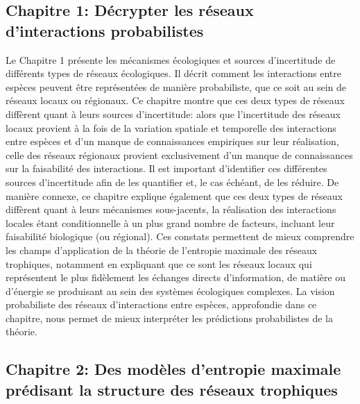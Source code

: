 \subsection{Chapitre 1: Décrypter les réseaux d'interactions probabilistes} 

Le Chapitre 1 présente les mécanismes écologiques et sources d'incertitude de
différents types de réseaux écologiques. Il décrit comment les interactions
entre espèces peuvent être représentées de manière probabiliste, que ce soit au
sein de réseaux locaux ou régionaux. Ce chapitre montre que ces deux types de
réseaux diffèrent quant à leurs sources d'incertitude: alors que l'incertitude
des réseaux locaux provient à la fois de la variation spatiale et temporelle des
interactions entre espèces et d'un manque de connaissances empiriques sur leur
réalisation, celle des réseaux régionaux provient exclusivement d'un manque de
connaissances sur la faisabilité des interactions. Il est important d'identifier
ces différentes sources d'incertitude afin de les quantifier et, le cas échéant,
de les réduire. De manière connexe, ce chapitre explique également que ces deux
types de réseaux diffèrent quant à leurs mécanismes sous-jacents, la réalisation
des interactions locales étant conditionnelle à un plus grand nombre de
facteurs, incluant leur faisabilité biologique (ou régional). Ces constats
permettent de mieux comprendre les champs d'application de la théorie de
l'entropie maximale des réseaux trophiques, notamment en expliquant que ce sont
les réseaux locaux qui représentent le plus fidèlement les échanges directs
d'information, de matière ou d'énergie se produisant au sein des systèmes
écologiques complexes. La vision probabiliste des réseaux d'interactions entre
espèces, approfondie dans ce chapitre, nous permet de mieux interpréter les
prédictions probabilistes de la théorie.

\subsection{Chapitre 2: Des modèles d'entropie maximale prédisant la structure des réseaux trophiques} 

